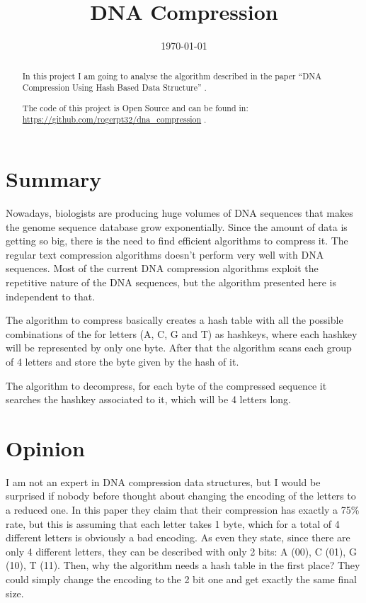 \documentclass[conference,a4paper]{IEEEtran}
\begin{document}
\title{DNA Compression}

\author{
}

\date{\today}

\maketitle

\begin{abstract}
In this project I am going to analyse the algorithm described in the paper ``DNA Compression Using Hash Based Data Structure'' \cite{paper_dna_compression}.

The code of this project is Open Source and can be found in: \url{https://github.com/rogerpt32/dna_compression} \cite{code}.
\end{abstract}

\section{Summary}
Nowadays, biologists are producing huge volumes of DNA sequences that makes the genome sequence database grow exponentially. Since the amount of data is getting so big, there is the need to find efficient algorithms to compress it. The regular text compression algorithms doesn't perform very well with DNA sequences. Most of the current DNA compression algorithms exploit the repetitive nature of the DNA sequences, but the algorithm presented here is independent to that.

The algorithm to compress basically creates a hash table with all the possible combinations of the for letters (A, C, G and T) as hashkeys, where each hashkey will be represented by only one byte. After that the algorithm scans each group of 4 letters and store the byte given by the hash of it.

The algorithm to decompress, for each byte of the compressed sequence it searches the hashkey associated to it, which will be 4 letters long.

\section{Opinion}
I am not an expert in DNA compression data structures, but I would be surprised if nobody before thought about changing the encoding of the letters to a reduced one. In this paper they claim that their compression has exactly a 75\% rate, but this is assuming that each letter takes 1 byte, which for a total of 4 different letters is obviously a bad encoding. As even they state, since there are only 4 different letters, they can be described with only 2 bits: A (00), C (01), G (10), T (11). Then, why the algorithm needs a hash table in the first place? They could simply change the encoding to the 2 bit one and get exactly the same final size.
\end{document}
